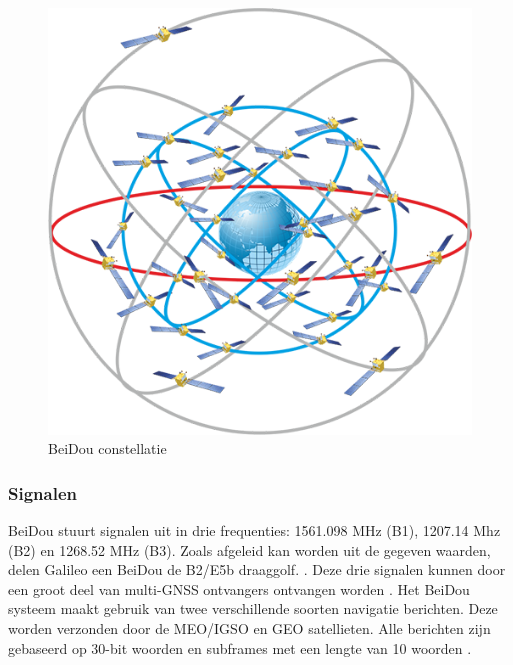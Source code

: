 \begin{figure}[hpb]
	\includegraphics[scale=0.5]{BeiDou.png}
	\caption{BeiDou constellatie \cite{LImgBeiDou}}
	\label{imgBeiDou}
\end{figure} 

\subsubsection{Signalen}
BeiDou stuurt signalen uit in drie frequenties: 1561.098 MHz (B1), 1207.14 Mhz (B2) en 1268.52 MHz (B3). Zoals afgeleid kan worden uit de gegeven waarden, delen Galileo een BeiDou de B2/E5b draaggolf. \cite{LBibPPP2,LBibBeiDou4}. Deze drie signalen kunnen door een groot deel van multi-GNSS ontvangers ontvangen worden \cite{LBibGNSS9}. Het BeiDou systeem maakt gebruik van twee verschillende soorten navigatie berichten. Deze worden verzonden door de MEO/IGSO en GEO satellieten. Alle berichten zijn gebaseerd op 30-bit woorden en subframes met een lengte van 10 woorden \cite{LBibBeiDou5}.  

